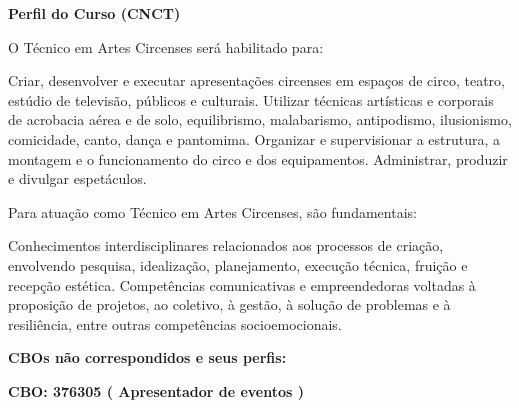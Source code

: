 \documentclass[
]{article}
\begin{document}
\textbf{Perfil do Curso (CNCT)}

O Técnico em Artes Circenses será habilitado para:

Criar, desenvolver e executar apresentações circenses em espaços de
circo, teatro, estúdio de televisão, públicos e culturais. Utilizar
técnicas artísticas e corporais de acrobacia aérea e de solo,
equilibrismo, malabarismo, antipodismo, ilusionismo, comicidade, canto,
dança e pantomima. Organizar e supervisionar a estrutura, a montagem e o
funcionamento do circo e dos equipamentos. Administrar, produzir e
divulgar espetáculos.

Para atuação como Técnico em Artes Circenses, são fundamentais:

Conhecimentos interdisciplinares relacionados aos processos de criação,
envolvendo pesquisa, idealização, planejamento, execução técnica,
fruição e recepção estética. Competências comunicativas e empreendedoras
voltadas à proposição de projetos, ao coletivo, à gestão, à solução de
problemas e à resiliência, entre outras competências socioemocionais.

\textbf{CBOs não correspondidos e seus perfis:}

\textbf{CBO: 376305  ( Apresentador de eventos )}
\end{document}
